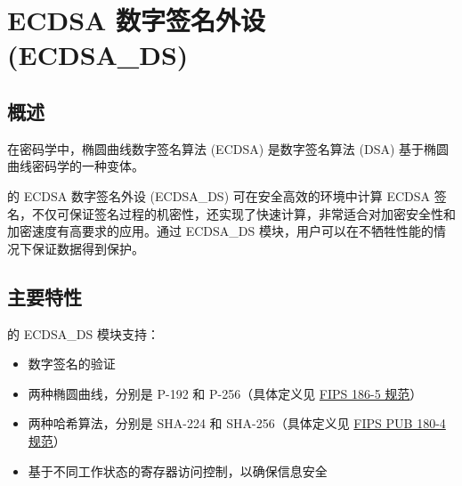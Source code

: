 \documentclass[main\_\_CN.tex]{subfiles}
\begin{document}

\ifglobal
\else
    {\let\clearpage\relax \listoftodos}
    {\let\clearpage\relax \listofdonetodos}
    \tableofcontents
\fi



\hypertarget{ecdsa}{}
\chapter{ECDSA 数字签名外设 (ECDSA\_DS)}
\label{mod:ecdsa}



\section{概述}

在密码学中，椭圆曲线数字签名算法 (ECDSA) 是数字签名算法 (DSA) 基于椭圆曲线密码学的一种变体。

\chipname{} 的 ECDSA 数字签名外设 (ECDSA\_DS) 可在安全高效的环境中计算 ECDSA 签名，不仅可保证签名过程的机密性，还实现了快速计算，非常适合对加密安全性和加密速度有高要求的应用。通过 ECDSA\_DS 模块，用户可以在不牺牲性能的情况下保证数据得到保护。


\section{主要特性}
\label{sec:ecdsa-features}

\chipname{} 的 ECDSA\_DS 模块支持：

\begin{itemize}
    \item 数字签名的验证
    \item 两种椭圆曲线，分别是 P-192 和 P-256（具体定义见 \href{https://nvlpubs.nist.gov/nistpubs/FIPS/NIST.FIPS.186-5.pdf}{FIPS 186-5 规范}）
    \item 两种哈希算法，分别是 SHA-224 和 SHA-256（具体定义见 \href{https://doi.org/10.6028/NIST.FIPS.180-4}{FIPS PUB 180-4 规范}）
    \item 基于不同工作状态的寄存器访问控制，以确保信息安全
\end{itemize}
\end{document}

